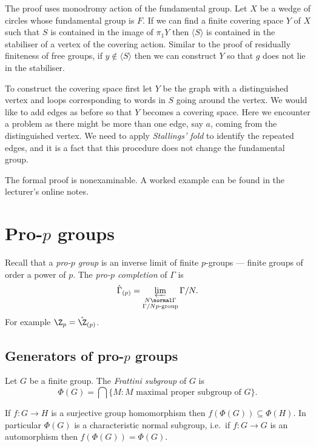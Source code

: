 \documentclass[a4paper]{article}
\begin{document}
The proof uses monodromy action of the fundamental group. Let \(X\) be a wedge of circles whose fundamental group is \(F\). If we can find a finite covering space \(Y\) of \(X\) such that \(S\) is contained in the image of \(\pi_1Y\) then \(\langle S\rangle\) is contained in the stabiliser of a vertex of the covering action. Similar to the proof of residually finiteness of free groups, if \(y \notin \langle S\rangle\) then we can construct \(Y\) so that \(g\) does not lie in the stabiliser.

To construct the covering space first let \(Y\) be the graph with a distinguished vertex and loops corresponding to words in \(S\) going around the vertex. We would like to add edges as before so that \(Y\) becomes a covering space. Here we encounter a problem as there might be more than one edge, say \(a\), coming from the distinguished vertex. We need to apply \emph{Stallings' fold} to identify the repeated edges, and it is a fact that this procedure does not change the fundamental group.

The formal proof is nonexaminable. A worked example can be found in the lecturer's online notes.

\section{Pro-\(p\) groups}

Recall that a \emph{pro-\(p\) group} is an inverse limit of finite \(p\)-groups --- finite groups of order a power of \(p\). The \emph{pro-\(p\) completion} of \(\Gamma\) is
\[
  \hat \Gamma_{(p)} = \varprojlim_{\substack{N \normal \Gamma \\ \Gamma/N p\text{-group}}} \Gamma/N.
\]
For example \(\Z_p = \hat \Z_{(p)}\).

\subsection{Generators of pro-\(p\) groups}

\begin{definition}
  Let \(G\) be a finite group. The \emph{Frattini subgroup} of \(G\) is
  \[
    \Phi(G) = \bigcap \{M: M \text{ maximal proper subgroup of } G\}.
  \]
\end{definition}

\begin{proposition}
  If \(f: G \to H\) is a surjective group homomorphism then \(f(\Phi(G)) \subseteq \Phi(H)\). In particular \(\Phi(G)\) is a characteristic normal subgroup, i.e.\ if \(f: G \to G\) is an automorphism then \(f(\Phi(G)) = \Phi(G)\).
\end{proposition}
\end{document}
